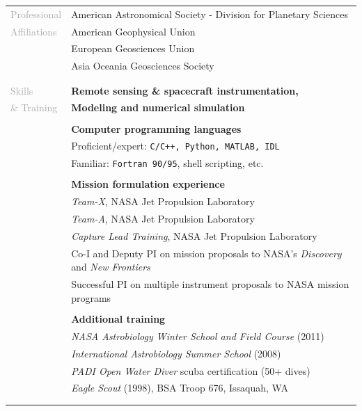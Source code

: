 \documentclass[letterpaper,10pt,twoside]{article}
\begin{document}
 \noindent \begin{tabular}{@{} l l}
 \large{\textcolor{darkgray}{Professional}} & American Astronomical Society - Division for Planetary Sciences \\
 \large{\textcolor{darkgray}{Affiliations}} & American Geophysical Union \\
 & European Geosciences Union \\
 & Asia Oceania Geosciences Society \\
 & \\
 &\\ 


 
 \large{\textcolor{darkgray}{Skills}} & \textbf{Remote sensing \& spacecraft instrumentation,} \\
 \large{\textcolor{darkgray}{\& Training}} & \textbf{Modeling and numerical simulation} \\
 & \\
 & \textbf{Computer programming languages} \\
 & Proficient/expert: {\tt C/C++, Python, MATLAB, IDL} \\
 & Familiar: {\tt Fortran 90/95}, shell scripting, etc. \\
 & \\
 & \textbf{Mission formulation experience} \\
 & \textit{Team-X}, NASA Jet Propulsion Laboratory \\
 & \textit{Team-A}, NASA Jet Propulsion Laboratory \\
 & \textit{Capture Lead Training}, NASA Jet Propulsion Laboratory \\
 & Co-I and Deputy PI on mission proposals to NASA's \textit{Discovery} and \textit{New Frontiers} \\
 & Successful PI on multiple instrument proposals to NASA mission programs \\
 & \\
 & \textbf{Additional training} \\
 & \textit{NASA Astrobiology Winter School and Field Course} (2011) \\
 & \textit{International Astrobiology Summer School} (2008) \\
 & \textit{PADI Open Water Diver} scuba certification (50+ dives) \\
 & \textit{Eagle Scout} (1998), BSA Troop 676, Issaquah, WA \\
 & \\
 & \\
 

\end{tabular}
\end{document}
